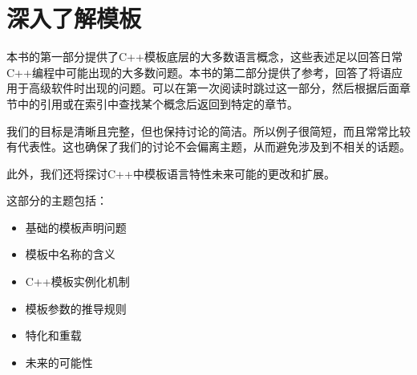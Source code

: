 \part{深入了解模板}

本书的第一部分提供了C++模板底层的大多数语言概念，这些表述足以回答日常C++编程中可能出现的大多数问题。本书的第二部分提供了参考，回答了将语应用于高级软件时出现的问题。可以在第一次阅读时跳过这一部分，然后根据后面章节中的引用或在索引中查找某个概念后返回到特定的章节。

我们的目标是清晰且完整，但也保持讨论的简洁。所以例子很简短，而且常常比较有代表性。这也确保了我们的讨论不会偏离主题，从而避免涉及到不相关的话题。

此外，我们还将探讨C++中模板语言特性未来可能的更改和扩展。

这部分的主题包括：

\begin{itemize}
  \item 基础的模板声明问题
  \item 模板中名称的含义
  \item C++模板实例化机制
  \item 模板参数的推导规则
  \item 特化和重载
  \item 未来的可能性
\end{itemize}







